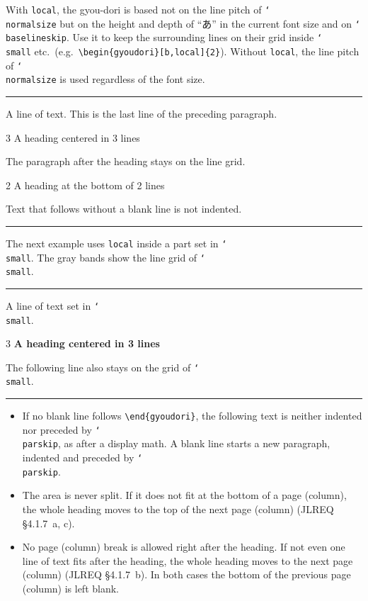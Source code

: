 \documentclass[paper=a4,dvipdfmx]{jlreq}
\newcommand\opt[1]{\texttt{#1}}
\newcommand\cs[1]{\texttt{\char`\\#1}}
\newenvironment{demo}
  {\par\medskip\noindent
   \begin{minipage}{\linewidth}\hrule\smallskip}
  {\par\smallskip\hrule\end{minipage}\par\medskip}
\begin{document}
With \opt{local}, the gyou-dori is based not on the line pitch of
\cs{normalsize} but on the height and depth of ``あ'' in the current font size
and on \cs{baselineskip}. Use it to keep the surrounding lines on their grid
inside \cs{small} etc.\ (e.g.\ \verb|\begin{gyoudori}[b,local]{2}|). Without
\opt{local}, the line pitch of \cs{normalsize} is used regardless of the font
size.

\begin{demo}
A line of text. This is the last line of the preceding paragraph.
\begin{gyoudori}{3}
\large A heading centered in 3 lines
\end{gyoudori}

The paragraph after the heading stays on the line grid.
\begin{gyoudori}[b]{2}
A heading at the bottom of 2 lines
\end{gyoudori}
Text that follows without a blank line is not indented.
\end{demo}

The next example uses \opt{local} inside a part set in \cs{small}. The gray
bands show the line grid of \cs{small}.

\begin{demo}
\small{}A line of text set in \cs{small}.
\begin{gyoudori}[local]{3}
\normalsize\bfseries A heading centered in 3 lines
\end{gyoudori}
The following line also stays on the grid of \cs{small}.
\end{demo}

\begin{itemize}
\item If no blank line follows \verb|\end{gyoudori}|, the following text is
  neither indented nor preceded by \cs{parskip}, as after a display math.
  A blank line starts a new paragraph, indented and preceded by \cs{parskip}.
\item The area is never split. If it does not fit at the bottom of a page
  (column), the whole heading moves to the top of the next page (column)
  (JLREQ \S4.1.7~a, c).
\item No page (column) break is allowed right after the heading. If not even
  one line of text fits after the heading, the whole heading moves to the next
  page (column) (JLREQ \S4.1.7~b). In both cases the bottom of the previous page
  (column) is left blank.
\end{itemize}
\end{document}
